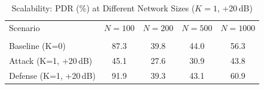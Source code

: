 \begin{table}[t]
\centering
\caption{Scalability: PDR (\%) at Different Network Sizes ($K=1$, +20\,dB)}
\label{tab:scalability}
\begin{tabular}{lcccc}
\toprule
Scenario & $N=100$ & $N=200$ & $N=500$ & $N=1000$ \\\\
\midrule
Baseline (K=0) & 87.3 & 39.8 & 44.0 & 56.3 \\
Attack (K=1, +20\,dB) & 45.1 & 27.6 & 30.9 & 43.8 \\
Defense (K=1, +20\,dB) & 91.9 & 39.3 & 43.1 & 60.9 \\
\bottomrule
\end{tabular}
\end{table}
